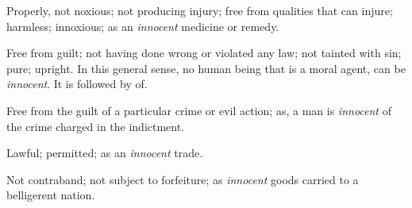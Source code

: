		\begin{compactitem}
			\item[1] Properly, not noxious; not producing injury; free from qualities that can injure; harmless; innoxious; as an \textit{innocent} medicine or remedy.
			\item[2] Free from guilt; not having done wrong or violated any law; not tainted with sin; pure; upright. In this general sense, no human being that is a moral agent, can be \textit{innocent}. It is followed by of.
			\item[3] Free from the guilt of a particular crime or evil action; as, a man is \textit{innocent} of the crime charged in the indictment.
			\item[4] Lawful; permitted; as an \textit{innocent} trade.
			\item[5] Not contraband; not subject to forfeiture; as \textit{innocent} goods carried to a belligerent nation.
		\end{compactitem}





	
	
			
